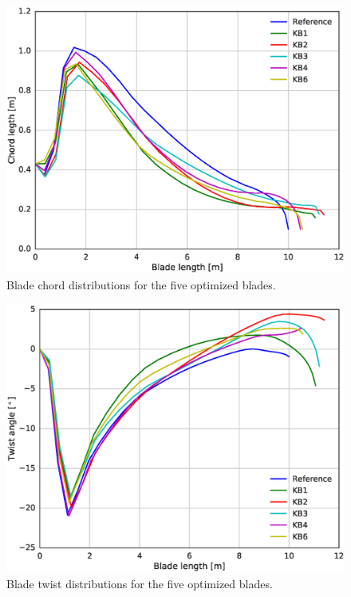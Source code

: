 \begin{figure}[!ht]
\begin{center}
	\includegraphics[width=.85\linewidth]{figures/KBcomp_chord.eps}
\end{center}
\caption{Blade chord distributions for the five optimized blades.}
\label{fig:chord}
\end{figure}


\begin{figure}[!ht]
\begin{center}
	\includegraphics[width=.85\linewidth]{figures/KBcomp_twist.eps}
\end{center}
\caption{Blade twist distributions for the five optimized blades.}
\label{fig:twist}
\end{figure}

